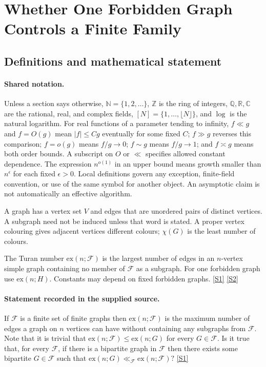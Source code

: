 \documentclass[11pt,a4paper]{article}
\newcommand{\N}{\mathbb{N}}
\newcommand{\Z}{\mathbb{Z}}
\newcommand{\Q}{\mathbb{Q}}
\newcommand{\R}{\mathbb{R}}
\newcommand{\C}{\mathbb{C}}
\newcommand{\sref}[2]{\hyperlink{source:#1:#2}{[S#2]}}
\begin{document}
\section{Whether One Forbidden Graph Controls a Finite Family}\label{statement}


\subsection{Definitions and mathematical statement}

\paragraph{Shared notation.}Unless a section says otherwise, $\N=\{1,2,\ldots\}$,
$\Z$ is the ring of integers, $\Q,\R,\C$ are the rational, real, and complex
fields, $[N]=\{1,\ldots,\lfloor N\rfloor\}$, and $\log$ is the natural
logarithm. For real functions of a parameter tending to infinity,
$f\ll g$ and $f=O(g)$ mean $|f|\leq Cg$ eventually for some fixed $C$;
$f\gg g$ reverses this comparison; $f=o(g)$ means $f/g\to0$;
$f\sim g$ means $f/g\to1$; and $f\asymp g$ means both order bounds.
A subscript on $O$ or $\ll$ specifies allowed constant dependence.
The expression $n^{o(1)}$ in an upper bound means growth smaller than
$n^\epsilon$ for each fixed $\epsilon>0$. Local definitions govern any
exception, finite-field convention, or use of the same symbol for another
object. An asymptotic claim is not automatically an effective algorithm.



A graph has a vertex set $V$ and edges that are unordered pairs of distinct vertices. A subgraph need not be induced unless that word is stated. A proper vertex colouring gives adjacent vertices different colours; $\chi(G)$ is the least number of colours.

The Turan number $\mathrm{ex}(n;\mathcal F)$ is the largest number of edges in an $n$-vertex simple graph containing no member of $\mathcal F$ as a subgraph. For one forbidden graph use $\mathrm{ex}(n;H)$. Constants may depend on fixed forbidden graphs. \sref{statement}{1} \sref{statement}{2}

\paragraph{Statement recorded in the supplied source.}
If $\mathcal{F}$ is a finite set of finite graphs then $\mathrm{ex}(n;\mathcal{F})$ is the maximum number of edges a graph on $n$ vertices can have without containing any subgraphs from $\mathcal{F}$. Note that it is trivial that $\mathrm{ex}(n;\mathcal{F})\leq \mathrm{ex}(n;G)$ for every $G\in\mathcal{F}$.
Is it true that, for every $\mathcal{F}$, if there is a bipartite graph in $\mathcal{F}$ then there exists some bipartite $G\in\mathcal{F}$ such that $ \mathrm{ex}(n;G)\ll_{\mathcal{F}}\mathrm{ex}(n;\mathcal{F})? $ \sref{statement}{1}
\end{document}
